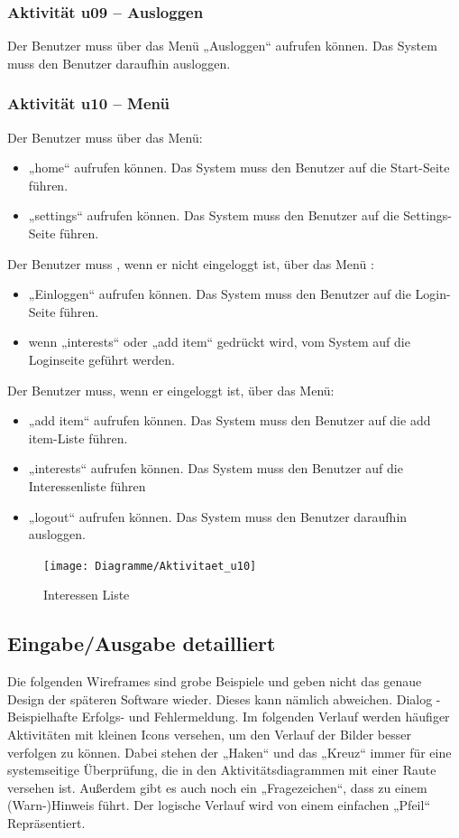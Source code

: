 \documentclass[a4paper,12pt,oneside]{scrartcl}
\begin{document}
\subsubsection{Aktivität u09 – Ausloggen}
Der Benutzer muss über das Menü „Ausloggen“ aufrufen können. Das System muss den Benutzer daraufhin ausloggen. 


\subsubsection{Aktivität u10 – Menü}
Der Benutzer muss über das Menü:
\begin{itemize}
	\item „home“ aufrufen können. Das System muss den Benutzer auf die Start-Seite führen.
	\item „settings“ aufrufen können. Das System muss den Benutzer auf die Settings-Seite führen.
\end{itemize}
Der Benutzer muss , wenn er nicht eingeloggt ist, über das Menü :
\begin{itemize}
	\item „Einloggen“ aufrufen können. Das System muss den Benutzer auf die Login-Seite führen.
	\item wenn „interests“ oder „add item“ gedrückt wird, vom System auf die Loginseite geführt werden.
\end{itemize}
Der Benutzer muss, wenn er eingeloggt ist, über das Menü:
\begin{itemize}
	\item „add item“ aufrufen können. Das System muss den Benutzer auf die add item-Liste führen.
	\item „interests“ aufrufen können. Das System muss den Benutzer auf die Interessenliste führen
	\item „logout“ aufrufen können. Das System muss den Benutzer daraufhin ausloggen. 
\end{itemize}

\begin{figure}[!htbp]
\centering
\noindent\texttt{[image: Diagramme/Aktivitaet\_u10]}
\caption{Interessen Liste}
\end{figure}
\FloatBarrier


\subsection{Eingabe/Ausgabe detailliert}
Die folgenden Wireframes sind grobe Beispiele und geben nicht das genaue Design der späteren Software wieder. Dieses kann nämlich abweichen. 
Dialog - Beispielhafte Erfolgs- und Fehlermeldung. 
Im folgenden Verlauf werden häufiger Aktivitäten mit kleinen Icons versehen, um den Verlauf der Bilder besser verfolgen zu können. Dabei stehen der „Haken“ und das „Kreuz“ immer für eine systemseitige Überprüfung, die in den Aktivitätsdiagrammen mit einer Raute versehen ist. Außerdem gibt es auch noch ein „Fragezeichen“, dass zu einem (Warn-)Hinweis führt. Der logische Verlauf wird von einem einfachen „Pfeil“ Repräsentiert.  
\end{document}
